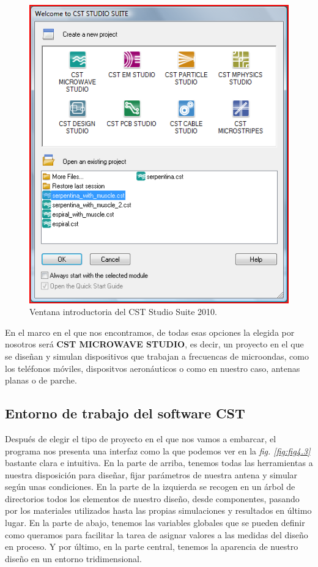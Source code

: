 \begin{figure}[!htb]
    \centering
    \includegraphics[scale=0.45]{./Metodologia/CST_Open_folder}
    \caption{Ventana introductoria del CST Studio Suite 2010.}
    \label{fig:fig4.2}
\end{figure}

En el marco en el que nos encontramos, de todas esas opciones la elegida por nosotros será \textbf{CST MICROWAVE STUDIO}, es decir, un proyecto en el que se diseñan y simulan dispositivos que trabajan a frecuencas de microondas, como los teléfonos móviles, dispositvos aeronáuticos o como en nuestro caso, antenas planas o de parche.

\subsection{Entorno de trabajo del software CST}\label{subsec:entorno-de-trabajo-del-software-cst}

Después de elegir el tipo de proyecto en el que nos vamos a embarcar, el programa nos presenta una interfaz como la que podemos ver en la \textit{fig. \ref{fig:fig4.3}} bastante clara e intuitiva. En la parte de arriba, tenemos todas las herramientas a nuestra disposición para diseñar, fijar parámetros de nuestra antena y simular según unas condiciones. En la parte de la izquierda se recogen en un árbol de directorios todos los elementos de nuestro diseño, desde componentes, pasando por los materiales utilizados hasta las propias simulaciones y resultados en último lugar. En la parte de abajo, tenemos las variables globales que se pueden definir como queramos para facilitar la tarea de asignar valores a las medidas del diseño en proceso. Y por último, en la parte central, tenemos la aparencia de nuestro diseño en un entorno tridimensional.

